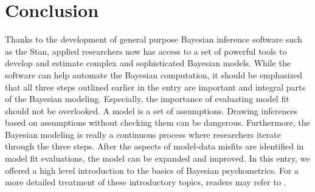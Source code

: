 \documentclass[floatsintext, man]{apa7}
\begin{document}
\section{Conclusion}
Thanks to the development of general purpose Bayesian inference software such as
the Stan, applied researchers now has access to a set of powerful tools to
develop and estimate complex and sophisticated Bayesian models. While the
software can help automate the Bayesian computation, it should be emphasized
that all three steps outlined earlier in the entry are important and integral
parts of the Bayesian modeling. Especially, the importance of evaluating model
fit should not be overlooked. A model is a set of assumptions.
Drawing inferences based on assumptions without checking them can be dangerous.
Furthermore, the Bayesian modeling is really a continuous process where
researchers iterate through the three steps. After the aspects of model-data
misfits are identified in model fit evaluations, the model can be expanded and
improved. In this entry, we offered a high level introduction to the basics of
Bayesian psychometrics. For a more detailed treatment of these introductory
topics, readers may refer to \textcite{gelman_bayesian_2013,levy_bayesian_2016}.



\printbibliography
\end{document}
